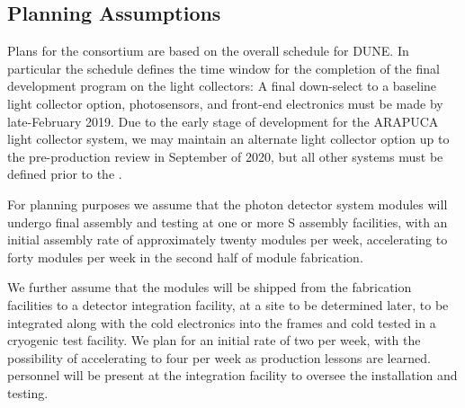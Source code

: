 \subsection{Planning Assumptions}
\label{sec:fdsp-pd-org-assmp}

Plans for the  consortium are based on the overall schedule for DUNE. In particular the  schedule defines the time window for the completion of the final development program on the light collectors: A final down-select to a baseline light collector option, photosensors, and front-end electronics must be made by late-February 2019.  Due to the early stage of development for the ARAPUCA light collector system, we may maintain an alternate light collector option up to the pre-production review in September of 2020, but all other systems must be defined prior to the .

For planning purposes we assume that the photon detector system modules will undergo final assembly and testing at one or more S assembly facilities, with an initial  assembly rate of approximately twenty modules per week, accelerating to forty modules per week in the second half of module fabrication.

We further assume that the modules will be shipped from the fabrication facilities to a detector integration facility, at a site to be determined later, to be integrated along with the cold electronics into the  frames and cold tested in a cryogenic test facility.  We plan for an initial rate of two  per week, with the possibility of accelerating to four  per week as production lessons are learned.   personnel will be present at the integration facility to oversee the installation and testing.


